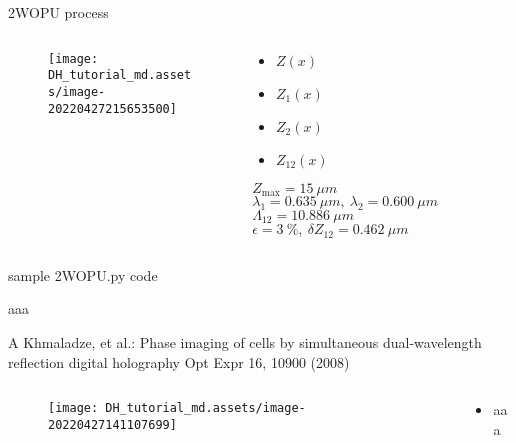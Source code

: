 \documentclass[t, aspectratio=169]{beamer}
\begin{document}
\begin{frame}{2WOPU process}
	\begin{columns}
		\begin{column}{0.6\textwidth}
			\vspace{-5 mm}
			\begin{figure}
				\texttt{[image: DH\_tutorial\_md.assets/image-20220427215653500]}
			\end{figure}
		\end{column}
		\begin{column}{0.4\textwidth}
			\begin{itemize}
				\item[a) ] $ Z(x) $
				\item[b) ] $ Z_1(x) $
				\item[c) ] $ Z_2(x) $
				\item[c) ] $ Z_{12}(x) $
			\end{itemize}
\vspace{5 mm}
$ Z_{\max}=15\ \mu m $
$ \lambda_1=0.635\ \mu m,\ \lambda_2 = 0.600\ \mu m $
$ \Lambda_{12} = 10.886\ \mu m $
$ \epsilon = 3\ \%,\ \delta Z_{12} = 0.462\ \mu m $
		\end{column}
	\end{columns}
\end{frame}


\begin{frame}[fragile]{sample 2WOPU.py code}
	\begin{semiverbatim}
aaa
	\end{semiverbatim}
\end{frame}


\begin{frame}{A Khmaladze, et al.: Phase imaging of cells by simultaneous dual-wavelength reflection digital holography}
	\vspace{-3 mm}
	\small Opt Expr 16, 10900 (2008)
	\begin{columns}
		\begin{column}{.6\textwidth}
			\begin{figure}
				\texttt{[image: DH\_tutorial\_md.assets/image-20220427141107699]}
			\end{figure}
		\end{column}
		\begin{column}{.4\textwidth}
			\begin{itemize}
				\item aaa
			\end{itemize}
		\end{column}
	\end{columns}
\end{frame}
\end{document}
